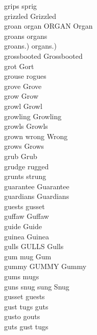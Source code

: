 grips sprig\\
grizzled Grizzled\\
groan organ ORGAN Organ\\
groans organs\\
groans.) organs.)\\
grossbooted Grossbooted\\
grot Gort\\
grouse rogues\\
grove Grove\\
grow Grow\\
growl Growl\\
growling Growling\\
growls Growls\\
grown wrong Wrong\\
grows Grows\\
grub Grub\\
grudge rugged\\
grunts strung\\
guarantee Guarantee\\
guardians Guardians\\
guests gusset\\
guffaw Guffaw\\
guide Guide\\
guinea Guinea\\
gulls GULLS Gulls\\
gum mug Gum\\
gummy GUMMY Gummy\\
gums mugs\\
guns snug sung Snug\\
gusset guests\\
gust tugs guts\\
gusto gouts\\
guts gust tugs\\

